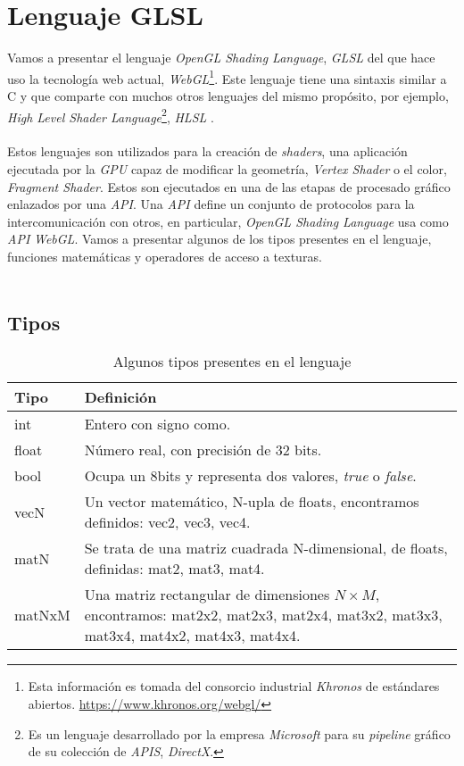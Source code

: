 \chapter{Lenguaje GLSL\label{ch:glsl}}

Vamos a presentar el lenguaje \textit{OpenGL Shading Language}, \textit{GLSL} \cite{glsl} del que hace uso la tecnología web actual, \textit{WebGL}\footnote{Esta información es tomada del consorcio industrial \textit{Khronos} de estándares abiertos. \url{https://www.khronos.org/webgl/}}. Este lenguaje tiene una sintaxis similar a C y que comparte con muchos otros lenguajes del mismo propósito, por ejemplo, \textit{High Level Shader Language}\footnote{Es un lenguaje desarrollado por la empresa \textit{Microsoft} para su \textit{pipeline} gráfico de su colección de \textit{APIS}, \textit{DirectX}.}, \textit{HLSL} \cite{hlsl}.\\\\
Estos lenguajes son utilizados para la creación de \textit{shaders}, una aplicación ejecutada por la \textit{GPU} capaz de modificar la geometría, \textit{Vertex Shader} o el color, \textit{Fragment Shader}. Estos son ejecutados en una de las etapas de procesado gráfico enlazados por una \textit{API}. Una \textit{API} define un conjunto de protocolos para la intercomunicación con otros, en particular, \textit{OpenGL Shading Language} usa como \textit{API} \textit{WebGL}. Vamos a presentar algunos de los tipos presentes en el lenguaje, funciones matemáticas y operadores de acceso a texturas.\\\\

\section{Tipos}
\begin{table}[H]
    \begin{tabularx}{\textwidth}{l|X}
      \toprule
      Tipo & Definición\\
      \midrule
      int & Entero con signo como.\\
      float & Número real, con precisión de 32 bits. \\
      bool & Ocupa un 8bits y representa dos valores, \textit{true} o \textit{false}. \\
      vecN & Un vector matemático, N-upla de floats, encontramos definidos: vec2, vec3, vec4. \\
      matN & Se trata de una matriz cuadrada N-dimensional, de floats, definidas: mat2, mat3, mat4. \\
      matNxM & Una matriz rectangular de dimensiones \(N\times M\), encontramos: mat2x2, mat2x3, mat2x4, mat3x2, mat3x3, mat3x4, mat4x2, mat4x3, mat4x4. \\
      \bottomrule
    \end{tabularx}
    \caption{Algunos tipos presentes en el lenguaje \label{eq:types}}
\end{table}
\newpage
